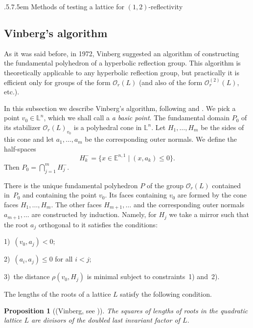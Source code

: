 \documentclass[reqno,12pt]{amsart}
\makeatletter
\def\section{\@startsection{section}{2}%
    {\z@}{.5\linespacing\@plus.7\linespacing}{.5em}%
    {\normalfont\bfseries\centering}}
\newcounter{z}
\newtheorem{proposition}{\indent Proposition}%
\makeatother
\begin{document}
\section{Methods of testing a lattice for $(1{,}2)$-reflectivity}
\label{s4}

\subsection{Vinberg's algorithm}
\label{ss4.1}

As it was said before, in 1972, Vinberg suggested an algorithm of constructing the fundamental
polyhedron of a hyperbolic reflection group. This algorithm is theoretically applicable to
any hyperbolic reflection group, but practically it is efficient only for groups of the
form $\mathcal{O}_r (L)$ (and also of the form $\mathcal{O}^{(2)}_r (L)$, etc.).


In this subsection we describe Vinberg's algorithm, following \cite{Vin72} and \cite{Vin73}.
We pick a point $v_0 \in \mathbb{L}^n$, which we shall call a
\textit{a basic point}. The fundamental domain $P_0$ of its stabilizer
$\mathcal{O}_r(L)_{v_0}$ is a polyhedral cone in $\mathbb{L}^n$. Let
$H_1, \dots , H_m$ be the sides of this cone and let $a_1, \dots , a_m$ be the
corresponding outer normals. We define the half-spaces
$$
H_k^-=\{x \in \mathbb{E}^{n,1}\mid (x, a_k) \le 0 \}.
$$
Then $P_0=\bigcap_{j=1}^m H_j^-$.

There is the unique fundamental polyhedron $P$ of the group
$\mathcal{O}_r(L)$ contained in~$P_0$ and
containing the point $v_0$. Its faces containing $v_0$ are formed by the cone faces
$H_1, \ldots, H_m$. The other faces $H_{m+1}, \ldots $ and the corresponding outer normals
 $a_{m+1} , \ldots $ are constructed by induction. Namely, for $H_j$ we take a mirror
 such that the root $a_j$ orthogonal to it satisfies the conditions:

1)~$(v_0, a_j) < 0$;

2)~$(a_i, a_j) \le 0$ for all $i < j$;

3)~the distance $\rho(v_0, H_j)$  is minimal subject to constraints~1) and~2).

The lengths of the roots of a lattice $L$ satisfy the following condition.

\begin{proposition}[{\rm(Vinberg, see \cite[Proposition~24]{Vin84})}]
\label{p4.1}
The squares of lengths
of roots in the quadratic lattice $L$ are divisors
of the doubled last invariant factor of $L$.
\end{proposition}
\end{document}
